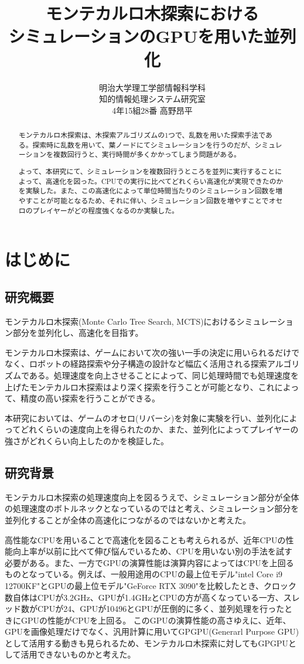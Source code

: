 \documentclass[10pt, a4paper]{jsarticle}
\title{モンテカルロ木探索における\\シミュレーションのGPUを用いた並列化}
\author{明治大学理工学部情報科学科\\知的情報処理システム研究室\\4年15組28番 高野昂平}
\date{}
\begin{document}
\maketitle
\newpage
\begin{abstract}
    モンテカルロ木探索は、木探索アルゴリズムの1つで、乱数を用いた探索手法である。探索時に乱数を用いて、葉ノードにてシミュレーションを行うのだが、シミュレーションを複数回行うと、実行時間が多くかかってしまう問題がある。
    \par よって、本研究にて、シミュレーションを複数回行うところを並列に実行することによって、高速化を図った。CPUでの実行に比べてどれくらい高速化が実現できたのかを実験した。また、この高速化によって単位時間当たりのシミュレーション回数を増やすことが可能となるため、それに伴い、シミュレーション回数を増やすことでオセロのプレイヤーがどの程度強くなるのか実験した。
\end{abstract}
\tableofcontents
\newpage
\section{はじめに}
\subsection{研究概要}
モンテカルロ木探索(Monte Carlo Tree Search, MCTS)におけるシミュレーション部分を並列化し、高速化を目指す。
\par モンテカルロ木探索は、ゲームにおいて次の強い一手の決定に用いられるだけでなく、ロボットの経路探索や分子構造の設計など幅広く活用される探索アルゴリズムである。処理速度を向上させることによって、同じ処理時間でも処理速度を上げたモンテカルロ木探索はより深く探索を行うことが可能となり、これによって、精度の高い探索を行うことができる。
\par 本研究においては、ゲームのオセロ(リバーシ)を対象に実験を行い、並列化によってどれくらいの速度向上を得られたのか、また、並列化によってプレイヤーの強さがどれくらい向上したのかを検証した。
\subsection{研究背景}
モンテカルロ木探索の処理速度向上を図るうえで、シミュレーション部分が全体の処理速度のボトルネックとなっているのではと考え、シミュレーション部分を並列化することが全体の高速化につながるのではないかと考えた。\par
高性能なCPUを用いることで高速化を図ることも考えられるが、近年CPUの性能向上率が以前に比べて伸び悩んでいるため、CPUを用いない別の手法を試す必要がある。また、一方でGPUの演算性能は演算内容によってはCPUを上回るものとなっている。例えば、一般用途用のCPUの最上位モデル"intel Core i9 12700KF"とGPUの最上位モデル"GeForce RTX 3090"を比較したとき、クロック数自体はCPUが3.2GHz、GPUが1.4GHzとCPUの方が高くなっている一方、スレッド数がCPUが24、GPUが10496とGPUが圧倒的に多く、並列処理を行ったときにGPUの性能がCPUを上回る。
このGPUの演算性能の高さゆえに、近年、GPUを画像処理だけでなく、汎用計算に用いてGPGPU(Generarl Purpose GPU)として活用する動きも見られるため、モンテカルロ木探索に対してもGPGPUとして活用できないものかと考えた。
\end{document}
